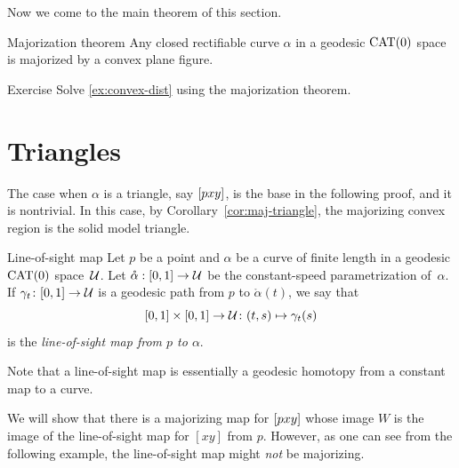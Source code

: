 Now we come to the main theorem of this section.

\begin{thm}{Majorization theorem}\label{thm:majorization}
\label{thm:major}
Any closed rectifiable curve $\alpha$ in a geodesic $\mathrm{CAT}(0)$ space is majorized by a convex plane figure.
\end{thm}

\begin{thm}{Exercise}\label{ex:convex-dist:major}
Solve \ref{ex:convex-dist} using the majorization theorem.
\end{thm}


\section{Triangles}

The case when $\alpha$ is a triangle, say $[pxy]$, is the base in the following proof, and it is nontrivial.
In this case, by Corollary~\ref{cor:maj-triangle}, the majorizing convex region is the solid model triangle.

\begin{thm}{Line-of-sight map} \label{def:sight}
Let $p$ be a point and $\alpha$ be a curve of finite length in a geodesic $\mathrm{CAT}(0)$ space~$\mathcal{U}$.
Let $\mathring\alpha:[0,1]\to\mathcal{U}$ be the constant-speed parametrization of~$\alpha$.  
If $\gamma_t\colon[0,1]\to\mathcal{U}$ is a geodesic path from $p$ to $\mathring\alpha(t)$, we say that 
\[
[0,1]\times[0,1]\to\mathcal{U}\colon(t,s)\mapsto\gamma_t(s)
\]
is the \emph{line-of-sight map from $p$ to $\alpha$}.  
\end{thm}

Note that a line-of-sight map is essentially a geodesic homotopy from a constant map to a curve.

We will show that there is a majorizing map for $[pxy]$ whose image $W$ is the image of the line-of-sight map for $[x y]$ from  $p$.
However, as one can see from the following example, the line-of-sight map might \textit{not} be majorizing.



